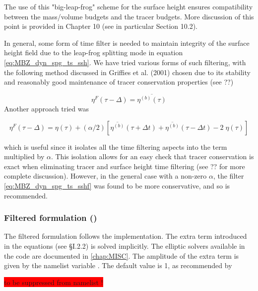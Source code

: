 \documentclass[../main/NEMO_manual]{subfiles}
\begin{document}
The use of this "big-leap-frog" scheme for the surface height ensures compatibility between
the mass/volume budgets and the tracer budgets.
More discussion of this point is provided in Chapter 10 (see in particular Section 10.2).

In general, some form of time filter is needed to maintain integrity of the surface height field due to
the leap-frog splitting mode in equation \autoref{eq:MBZ_dyn_spg_ts_ssh}.
We have tried various forms of such filtering,
with the following method discussed in Griffies et al. (2001) chosen due to its stability and
reasonably good maintenance of tracer conservation properties (see ??)

\begin{equation}
  \label{eq:MBZ_dyn_spg_ts_sshf}
  \eta^{F}(\tau-\Delta) =  \overline{\eta^{(b)}(\tau)}
\end{equation}
Another approach tried was

\[
  \eta^{F}(\tau-\Delta) = \eta(\tau)
  + (\alpha/2) \left[\overline{\eta^{(b)}}(\tau+\Delta t)
    + \overline{\eta^{(b)}}(\tau-\Delta t) -2 \;\eta(\tau) \right]
\]

which is useful since it isolates all the time filtering aspects into the term multiplied by $\alpha$.
This isolation allows for an easy check that tracer conservation is exact when eliminating tracer and
surface height time filtering (see ?? for more complete discussion).
However, in the general case with a non-zero $\alpha$, the filter \autoref{eq:MBZ_dyn_spg_ts_sshf} was found to
be more conservative, and so is recommended.

\subsubsection[Filtered formulation (\texttt{\textbf{key\_dynspg\_flt}})]{Filtered formulation (\protect{})}
\label{subsec:MBZ_dyn_spg_flt}

The filtered formulation follows the \citet{Roullet2000?} implementation.
The extra term introduced in the equations (see {\S}I.2.2) is solved implicitly.
The elliptic solvers available in the code are documented in \autoref{chap:MISC}.
The amplitude of the extra term is given by the namelist variable .
The default value is 1, as recommended by \citet{Roullet2000?}

\colorbox{red}{ to be suppressed from namelist !}
\end{document}
